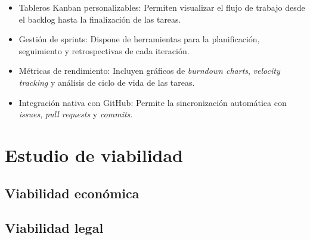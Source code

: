 \begin{itemize}
\tightlist
\item
Tableros Kanban personalizables: Permiten visualizar el flujo de trabajo desde el backlog hasta la finalización de las tareas.
\item
Gestión de sprints: Dispone de herramientas para la planificación, seguimiento y retrospectivas de cada iteración.
\item
Métricas de rendimiento: Incluyen gráficos de \emph{burndown charts}, \emph{velocity tracking} y análisis de ciclo de vida de las tareas.
\item
Integración nativa con GitHub: Permite la sincronización automática con \emph{issues}, \emph{pull requests} y \emph{commits}.
\end{itemize}

\section{Estudio de viabilidad}


\subsection{Viabilidad económica}


\subsection{Viabilidad legal}



